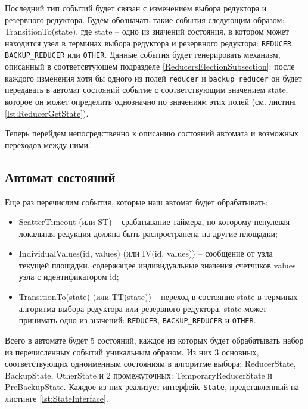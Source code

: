 \documentclass{article}
\theoremstyle{plain}
\theoremstyle{plain}
\theoremstyle{plain}
\theoremstyle{plain}
\theoremstyle{definition}
\theoremstyle{remark}
\theoremstyle{plain}
\begin{document}
Последний тип событий будет связан с изменением выбора редуктора и резервного редуктора. Будем обозначать такие события следующим образом: TransitionTo(state), где state -- одно из значений состояния, в котором может находится узел в терминах выбора редуктора и резервного редуктора: \texttt{REDUCER}, \texttt{BACKUP\_REDUCER} или \texttt{OTHER}. Данные события будет генерировать механизм, описанный в соответсвтующем подразделе \ref{ReducersElectionSubsection}: после каждого изменения хотя бы одного из полей \texttt{reducer} и \texttt{backup\_reducer} он будет передавать в автомат состояний событие с соответствующим значением state, которое он может определить однозначно по значениям этих полей (см. листинг \ref{lst:ReducerGetState}).

Теперь перейдем непосредственно к описанию состояний автомата и возможных переходов между ними.

\subsection{Автомат состояний}
\label{StateMachineSubsection}

Еще раз перечислим события, которые наш автомат будет обрабатывать:

\begin{itemize}
    \item ScatterTimeout (или ST) -- срабатывание таймера, по которому ненулевая локальная редукция должна быть распространена на другие площадки;
    
    \item IndividualValues(id, values) (или IV(id, values)) -- сообщение от узла текущей площадки, содержащее индивидуальные значения счетчиков values узла с идентификатором id;
    
    \item TransitionTo(state) (или TT(state)) -- переход в состояние state в терминах алгоритма выбора редуктора или резервного редуктора, state может принимать одно из значений: \texttt{REDUCER}, \texttt{BACKUP\_REDUCER} и \texttt{OTHER}.
\end{itemize}

Всего в автомате будет 5 состояний, каждое из которых будет обрабатывать набор из перечисленных событий уникальным образом. Из них 3 основных, соответствующих одноименным состояниям в алгоритме выбора: ReducerState, BackupState, OtherState и 2 промежуточных: TemporaryReducerState и PreBackupState. Каждое из них реализует интерфейс \texttt{State}, представленный на листинге \ref{lst:StateInterface}.
\end{document}
